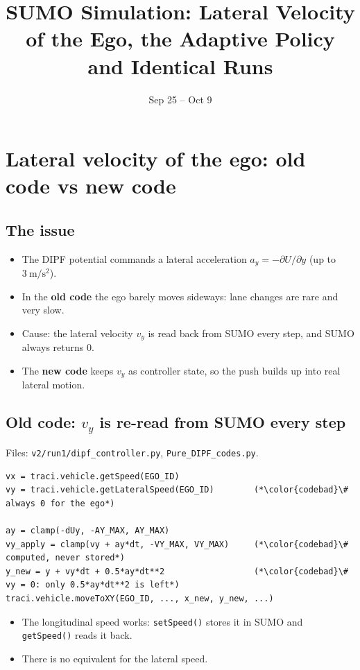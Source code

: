 \documentclass[11pt,a4paper]{article}
\title{\color{accent}\textbf{SUMO Simulation: Lateral Velocity of the Ego, the Adaptive Policy and Identical Runs}}
\date{Sep 25 -- Oct 9}
\begin{document}
\maketitle

\section{Lateral velocity of the ego: old code vs new code}

\subsection{The issue}
\begin{itemize}
  \item The DIPF potential commands a lateral acceleration $a_y = -\partial U/\partial y$ (up to $3~\mathrm{m/s^2}$).
  \item In the \textbf{old code} the ego barely moves sideways: lane changes are rare and very slow.
  \item Cause: the lateral velocity $v_y$ is read back from SUMO every step, and SUMO always returns $0$.
  \item The \textbf{new code} keeps $v_y$ as controller state, so the push builds up into real lateral motion.
\end{itemize}

\subsection{Old code: $v_y$ is re-read from SUMO every step}
Files: \texttt{v2/run1/dipf\_controller.py}, \texttt{Pure\_DIPF\_codes.py}.
\begin{lstlisting}
vx = traci.vehicle.getSpeed(EGO_ID)
vy = traci.vehicle.getLateralSpeed(EGO_ID)        (*\color{codebad}\# always 0 for the ego*)

ay = clamp(-dUy, -AY_MAX, AY_MAX)
vy_apply = clamp(vy + ay*dt, -VY_MAX, VY_MAX)     (*\color{codebad}\# computed, never stored*)
y_new = y + vy*dt + 0.5*ay*dt**2                  (*\color{codebad}\# vy = 0: only 0.5*ay*dt**2 is left*)
traci.vehicle.moveToXY(EGO_ID, ..., x_new, y_new, ...)
\end{lstlisting}
\begin{itemize}
  \item The longitudinal speed works: \texttt{setSpeed()} stores it in SUMO and \texttt{getSpeed()} reads it back.
  \item There is no equivalent for the lateral speed.
\end{itemize}
\end{document}
